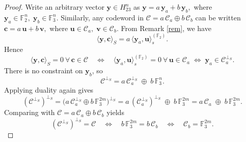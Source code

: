 \documentclass[10pt,a4paper]{amsart}
\def\C{{\mathcal{C}}}
\begin{document}
\begin{proof}
Write an arbitrary vector \(\mathbf{y}\in H_{23}^{n}\) as $\mathbf{y} = a\,\mathbf{y}_a + b\,\mathbf{y}_b,
$ where $
\mathbf{y}_a\in\mathbb{F}_2^{n},\;\mathbf{y}_b\in\mathbb{F}_3^{n}.$
Similarly, any codeword in \(\mathcal{C}=a\,\mathcal{C}_a\oplus b\,\mathcal{C}_b\) can be written $\mathbf{c} = a\,\mathbf{u} + b\,\mathbf{v},$ where $\mathbf{u}\in\mathcal{C}_a,\;\mathbf{v}\in\mathcal{C}_b.$
From Remark \ref{rem}, we have 
\[
\langle \mathbf{y},\mathbf{c}\rangle_S
= a\,\langle \mathbf{y}_a,\mathbf{u}\rangle_s^{(\mathbb{F}_2)}.
\]
Hence
\[
\langle \mathbf{y},\mathbf{c}\rangle_S = 0\ \forall\,\mathbf{c}\in\C
\quad\Longleftrightarrow\quad
\langle \mathbf{y}_a,\mathbf{u}\rangle_s^{(\mathbb{F}_2)}=0\ \forall\,\mathbf{u}\in\C_a
\;\Longleftrightarrow\;
\mathbf{y}_a\in\C_a^{\perp_S}.
\]
There is no constraint on \(\mathbf{y}_b\), so
\[
\C^{\perp_S}
= a\,\C_a^{\perp_S}\;\oplus\;b\,\mathbb{F}_3^{n}.
\]
Applying duality again gives
\[
(\mathcal{C}^{\perp_S})^{\perp_S}
= \bigl(a\,\mathcal{C}_a^{\perp_S}\oplus b\,\mathbb{F}_3^{2m}\bigr)^{\perp_S}
= a\,(\mathcal{C}_a^{\perp_S})^{\perp_S}\;\oplus\;b\,\mathbb{F}_3^{2m}
= a\,\mathcal{C}_a\;\oplus\;b\,\mathbb{F}_3^{2m}.
\]
Comparing with \(\mathcal{C}=a\,\mathcal{C}_a\oplus b\,\mathcal{C}_b\) yields
\[
(\mathcal{C}^{\perp_S})^{\perp_S} = \mathcal{C}
\quad\Longleftrightarrow\quad
b\,\mathbb{F}_3^{2m} = b\,\mathcal{C}_b
\quad\Longleftrightarrow\quad
\mathcal{C}_b = \mathbb{F}_3^{2m}.
\]

\end{proof}
\end{document}
